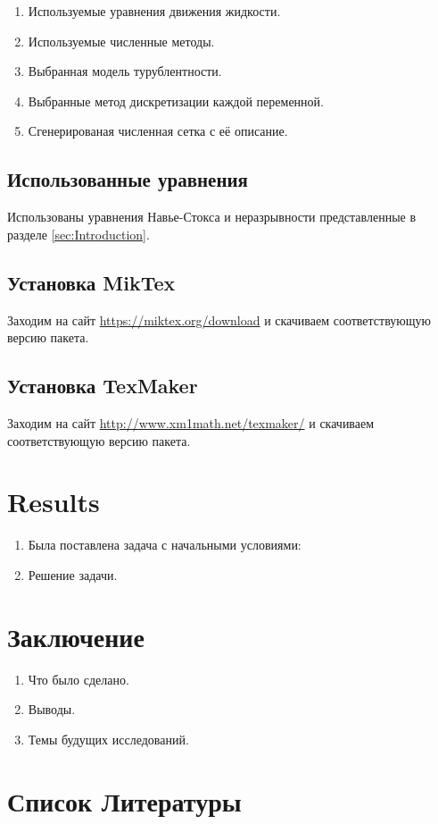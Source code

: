\documentclass[11pt]{article}
\begin{document}
\begin{enumerate}
	\item Используемые уравнения движения жидкости.
	\item Используемые численные методы.
	\item Выбранная модель турублентности.
	\item Выбранные метод дискретизации каждой переменной.
	\item Сгенерированая численная сетка с её описание.
\end{enumerate}

\subsection{Использованные уравнения}\label{sec:FlowEqs}
Использованы уравнения Навье-Стокса и неразрывности представленные в разделе \ref{sec:Introduction}.

\subsection{Установка MikTex}\label{sec:MikTex}
Заходим на сайт \url{https://miktex.org/download} и скачиваем соответствующую версию пакета.

\subsection{Установка TexMaker}\label{sec:MikTex}
Заходим на сайт \url{http://www.xm1math.net/texmaker/} и скачиваем соответствующую версию пакета.

\section{Results\label{sec:Results}}
	\begin{enumerate}
		\item Была поставлена задача с начальными условиями:
		\item Решение задачи.
	\end{enumerate}
	
\section{Заключение}

	\begin{enumerate}
		\item Что было сделано.
		\item Выводы.
		\item Темы будущих исследований.
	\end{enumerate}
	
\section{Список Литературы} 
\end{document}
